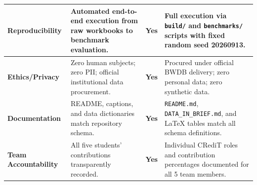 \documentclass[11pt,a4paper]{article}
\begin{document}
\begin{table}[htbp]
\begin{tabularx}{\linewidth}{|>{\bfseries}p{3.2cm}|X|c|X|}
\cellcolor{wordkeybg}Reproducibility & Automated end-to-end execution from raw workbooks to benchmark evaluation. & \textbf{Yes} & Full execution via \texttt{build/} and \texttt{benchmarks/} scripts with fixed random seed 20260913. \\ \hline
\cellcolor{wordkeybg}Ethics/Privacy & Zero human subjects; zero PII; official institutional data procurement. & \textbf{Yes} & Procured under official BWDB delivery; zero personal data; zero synthetic data. \\ \hline
\cellcolor{wordkeybg}Documentation & README, captions, and data dictionaries match repository schema. & \textbf{Yes} & \texttt{README.md}, \texttt{DATA\_IN\_BRIEF.md}, and LaTeX tables match all schema definitions. \\ \hline
\cellcolor{wordkeybg}Team Accountability & All five students' contributions transparently recorded. & \textbf{Yes} & Individual CRediT roles and contribution percentages documented for all 5 team members. \\ \hline
\end{tabularx}
\end{table}
\end{document}
